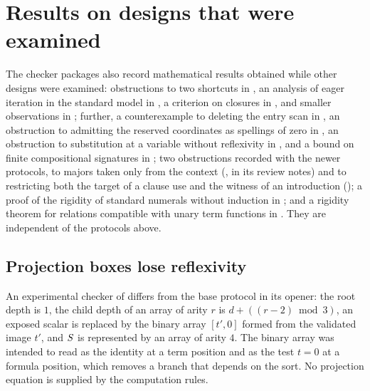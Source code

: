 \section{Results on designs that were examined}\label{cert:sec:notes}

The checker packages also record mathematical results obtained while other
designs were examined: obstructions to two shortcuts in ,
an analysis of eager iteration in the standard model in
, a criterion on closures in
, and smaller observations in
; further, a counterexample to deleting the
entry scan in , an obstruction to admitting the
reserved coordinates as spellings of zero in , an
obstruction to substitution at a variable without reflexivity in
, and a bound on finite compositional signatures in
; two obstructions recorded with the newer
protocols, to majors taken only from the context
(, in its review notes) and to restricting both
the target of a clause use and the witness of an introduction
(); a proof of the rigidity of standard numerals
without induction in ; and a rigidity theorem for
relations compatible with unary term functions in . They are
independent of the protocols above.

\subsection{Projection boxes lose reflexivity}

An experimental checker of  differs from the base
protocol in its opener: the root depth is $1$, the child depth of an array of
arity $r$ is $d+((r-2)\bmod 3)$, an exposed scalar is replaced by the binary
array $[t',0]$ formed from the validated image $t'$, and $S$ is
represented by an array of arity $4$. The binary array was intended to read as
the identity at a term position and as the test $t=0$ at a formula position,
which removes a branch that depends on the sort. No projection equation is
supplied by the computation rules.

